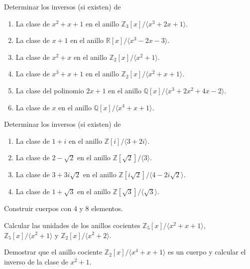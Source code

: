 \begin{ejercicio}
    Determinar los inversos (si existen) de
    \begin{enumerate}
        \item La clase de $x^2+x+1$ en el anillo $\mathbb{Z}_3[x]/\langle x^3+2x+1 \rangle$.
        \item La clase de $x+1$ en el anillo $\mathbb{R}[x]/\langle x^3-2x-3\rangle$.
        \item La clase de $x^2+x$ en el anillo $\mathbb{Z}_2[x]/\langle x^2+1\rangle$.
        \item La clase de $x^3+x+1$ en el anillo $\mathbb{Z}_2[x]/\langle x^2+x+1\rangle$.
        \item La clase del polinomio $2x+1$ en el anillo $\mathbb{Q}[x]/\langle x^3+2x^2+4x-2\rangle$.
        \item La clase de $x$ en el anillo $\mathbb{Q}[x]/\langle x^4 + x + 1\rangle$.
    \end{enumerate}
\end{ejercicio}

\begin{ejercicio}
    Determinar los inversos (si existen) de
    \begin{enumerate}
        \item La clase de $1+i$ en el anillo $\mathbb{Z}[i]/\langle 3+2i\rangle$.
        \item La clase de $2-\sqrt{2}$ en el anillo $\mathbb{Z}\left[\sqrt{2}\right]/\langle 3\rangle$.
        \item La clase de $3+3i\sqrt{2}$ en el anillo $\mathbb{Z}[i\sqrt{2}]/\langle 4-2i\sqrt{2} \rangle $.
        \item La clase de $1+\sqrt{3}$ en el anillo $\mathbb{Z}\left[\sqrt{3}\right]/\langle \sqrt{3} \rangle $.
    \end{enumerate}
\end{ejercicio}

\begin{ejercicio}
    Construir cuerpos con 4 y 8 elementos.
\end{ejercicio}

\begin{ejercicio}
    Calcular las unidades de los anillos cocientes $\mathbb{Z}_5[x]/\langle x^2+x+1 \rangle $, $\mathbb{Z}_5[x]/\langle x^2+1 \rangle $ y $\mathbb{Z}_2[x]/\langle x^2+2 \rangle $.
\end{ejercicio}

\begin{ejercicio}
    Demostrar que el anillo cociente $\mathbb{Z}_2[x]/\langle x^4+x+1 \rangle $ es un cuerpo y calcular el inverso de la clase de $x^2+1$.
\end{ejercicio}

\resetearcontador
\newpage
